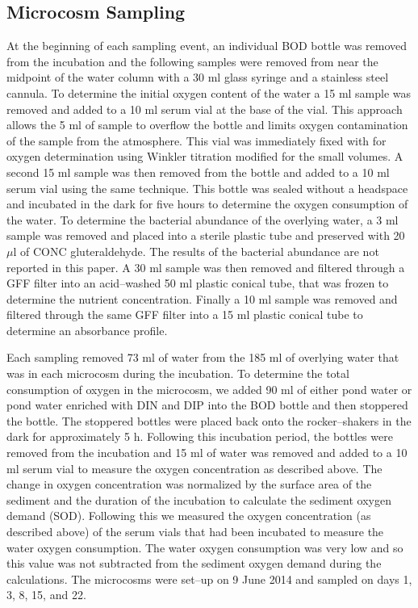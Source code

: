 \subsection{Microcosm Sampling}
At the beginning of each sampling event, an individual BOD bottle was removed from the incubation and the following samples were removed from near the midpoint of the water column with a 30 ml glass syringe and a stainless steel cannula. To determine the initial oxygen content of the water a 15 ml sample was removed and added to a 10 ml serum vial at the base of the vial. This approach allows the 5 ml of sample to overflow the bottle and limits oxygen contamination of the sample from the atmosphere. This vial was immediately fixed with for oxygen determination using Winkler titration \cite{CARPENTER_1965} modified for the small volumes. A second 15 ml sample was then removed from the bottle and added to a 10 ml serum vial using the same technique. This bottle was sealed without a headspace and incubated in the dark for five hours to determine the oxygen consumption of the water. To determine the bacterial abundance of the overlying water, a 3 ml sample was removed and placed into a sterile plastic tube and preserved with 20 $\mu$l of CONC gluteraldehyde. The results of the bacterial abundance are not reported in this paper. A 30 ml sample was then removed and filtered through a GFF filter into an acid--washed 50 ml plastic conical tube, that was frozen to determine the nutrient concentration. Finally a 10 ml sample was removed and filtered through the same GFF filter into a 15 ml plastic conical tube to determine an absorbance profile. 

Each sampling removed 73 ml of water from the 185 ml of overlying water that was in each microcosm during the incubation. To determine the total consumption of oxygen in the microcosm, we added 90 ml of either pond water or pond water enriched with DIN and DIP into the BOD bottle and then stoppered the bottle. The stoppered bottles were placed back onto the rocker--shakers in the dark for approximately 5 h. Following this incubation period, the bottles were removed from the incubation and 15 ml of water was removed and added to a 10 ml serum vial to measure the oxygen concentration as described above. The change in oxygen concentration was normalized by the surface area of the sediment and the duration of the incubation to calculate the sediment oxygen demand (SOD). Following this we measured the oxygen concentration (as described above) of the serum vials that had been incubated to measure the water oxygen consumption. The water oxygen consumption was very low and so this value was not subtracted from the sediment oxygen demand during the calculations. The microcosms were set--up on 9 June 2014 and sampled on days 1, 3, 8, 15, and 22. 
 
